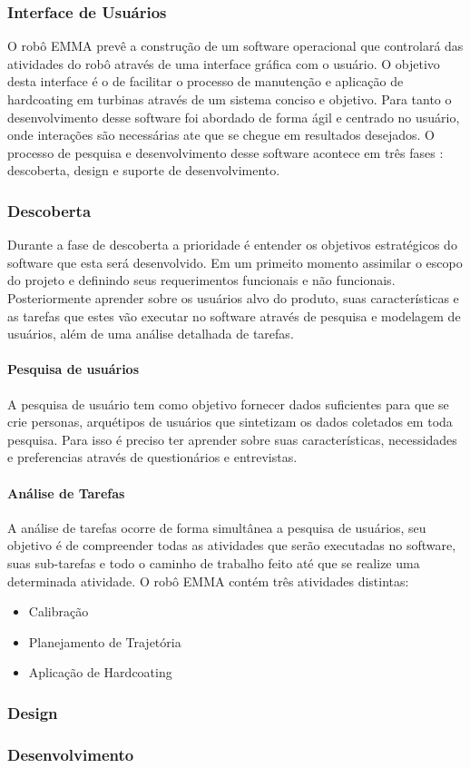  \subsubsection{Interface de Usuários}\label{sec::interface} 

O robô EMMA prevê a construção de um software operacional que 
controlará das atividades do robô através de uma interface gráfica com o
usuário.
O objetivo desta interface é o de facilitar o processo de manutenção e aplicação
de hardcoating em turbinas através de um sistema conciso e objetivo. Para tanto
o desenvolvimento desse software foi abordado de forma ágil e centrado no
usuário, onde interações são necessárias ate que se chegue em resultados
desejados.
O processo de pesquisa e desenvolvimento desse software acontece em três fases :
descoberta, design e suporte de desenvolvimento.

\subsubsection{Descoberta}

Durante a fase de descoberta a prioridade é entender os objetivos estratégicos
do software que esta será desenvolvido. Em um primeito momento assimilar o
escopo do projeto e definindo seus requerimentos funcionais e não funcionais. 
Posteriormente aprender sobre os usuários alvo do produto, suas características
e as tarefas que estes vão executar no software através de pesquisa e
modelagem de usuários, além de uma análise detalhada de tarefas.

\paragraph{Pesquisa de usuários}
A pesquisa de usuário tem como objetivo fornecer dados suficientes para que se
crie personas, arquétipos de usuários que sintetizam os dados
coletados em toda pesquisa. Para isso é preciso
ter aprender sobre suas características, necessidades e preferencias através de questionários e entrevistas. 

\paragraph{Análise de Tarefas}
A análise de tarefas ocorre de forma simultânea a pesquisa de usuários, seu
objetivo é de compreender todas as atividades que serão executadas no software,
suas sub-tarefas e todo o caminho de trabalho feito até que se realize
uma determinada atividade.
O robô EMMA contém três atividades distintas:

\begin{itemize}
  \item Calibração
  \item Planejamento de Trajetória
  \item Aplicação de Hardcoating
\end{itemize}



\subsubsection{Design}

\subsubsection{Desenvolvimento}





